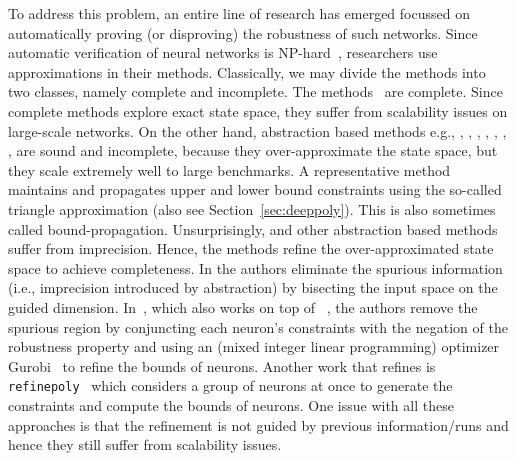 To address this problem, an entire line of research has emerged focussed on automatically proving (or disproving) the robustness of such networks. Since automatic verification of neural networks is NP-hard~\cite{katz2021reluplex}, researchers use approximations in their methods. Classically, we may divide the methods into two classes, namely complete and incomplete. The methods~\cite{lomuscio2017approach,fischetti2018deep,dutta2018output,cheng2017maximum,katz2017reluplex,katz2019marabou,ehlers2017formal,huang2017safety,wang2021beta,xu2020fast,zhang2022general} are complete. Since complete methods explore exact state space, they suffer from scalability issues on large-scale networks. On the other hand, abstraction based methods e.g., \cite{dvijotham2018dual}, \cite{gehr2018ai2}, \cite{singh2018fast},  \cite{singh2018boosting}, \cite{weng2018towards}, \cite{wong2018provable}, \cite{zhang2018efficient}, \cite{zhang2018efficient} are sound and incomplete, because they over-approximate the state space, but they scale extremely well to large benchmarks. A representative method \deeppoly{}~\cite{singh2019abstract} maintains and propagates upper and lower bound constraints using the so-called triangle approximation (also see Section~\ref{sec:deeppoly}). This is also sometimes called bound-propagation. %
Unsurprisingly, \deeppoly{} and other abstraction based methods suffer from imprecision. Hence, the methods \cite{wang2018formal,wang2018efficient,elboher2020abstraction,yang2021improving,lin2020art} refine the over-approximated state space to achieve completeness. In \cite{wang2018formal,wang2018efficient,lin2020art} the authors eliminate the spurious information (i.e., imprecision introduced by abstraction) by bisecting the input space on the guided dimension. In~\cite{yang2021improving}, which also works on top of \deeppoly{}~\cite{singh2019abstract}, the authors remove the spurious region by  conjuncting each neuron's constraints with the negation of the robustness property and using an \milp{} (mixed integer linear programming) optimizer Gurobi~\cite{gurobioptimizer} to refine the bounds of neurons. Another work that refines
\deeppoly{} %
is \texttt{refinepoly}~\cite{singh2019beyond} which considers 
a group of neurons at once to generate the constraints and compute the bounds of neurons. One issue with all these approaches is that the refinement is not guided by previous information/runs and hence they still suffer from scalability issues.



